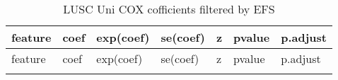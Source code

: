 \documentclass[
]{article}
\begin{document}
\begin{longtable}[]{@{}lllllll@{}}
\caption{\label{tab:LUSC-Uni-COX-cofficients-filtered-by-EFS}LUSC Uni COX cofficients filtered by EFS}\tabularnewline
\toprule
\begin{minipage}[b]{0.08\columnwidth}\raggedright
feature\strut
\end{minipage} & \begin{minipage}[b]{0.12\columnwidth}\raggedright
coef\strut
\end{minipage} & \begin{minipage}[b]{0.12\columnwidth}\raggedright
exp(coef)\strut
\end{minipage} & \begin{minipage}[b]{0.12\columnwidth}\raggedright
se(coef)\strut
\end{minipage} & \begin{minipage}[b]{0.12\columnwidth}\raggedright
z\strut
\end{minipage} & \begin{minipage}[b]{0.12\columnwidth}\raggedright
pvalue\strut
\end{minipage} & \begin{minipage}[b]{0.12\columnwidth}\raggedright
p.adjust\strut
\end{minipage}\tabularnewline
\midrule
\endfirsthead
\toprule
\begin{minipage}[b]{0.08\columnwidth}\raggedright
feature\strut
\end{minipage} & \begin{minipage}[b]{0.12\columnwidth}\raggedright
coef\strut
\end{minipage} & \begin{minipage}[b]{0.12\columnwidth}\raggedright
exp(coef)\strut
\end{minipage} & \begin{minipage}[b]{0.12\columnwidth}\raggedright
se(coef)\strut
\end{minipage} & \begin{minipage}[b]{0.12\columnwidth}\raggedright
z\strut
\end{minipage} & \begin{minipage}[b]{0.12\columnwidth}\raggedright
pvalue\strut
\end{minipage} & \begin{minipage}[b]{0.12\columnwidth}\raggedright
p.adjust\strut
\end{minipage}\tabularnewline
\midrule
\endhead
\begin{minipage}[t]{0.08\columnwidth}\raggedright

\end{minipage}
\end{longtable}
\end{document}
